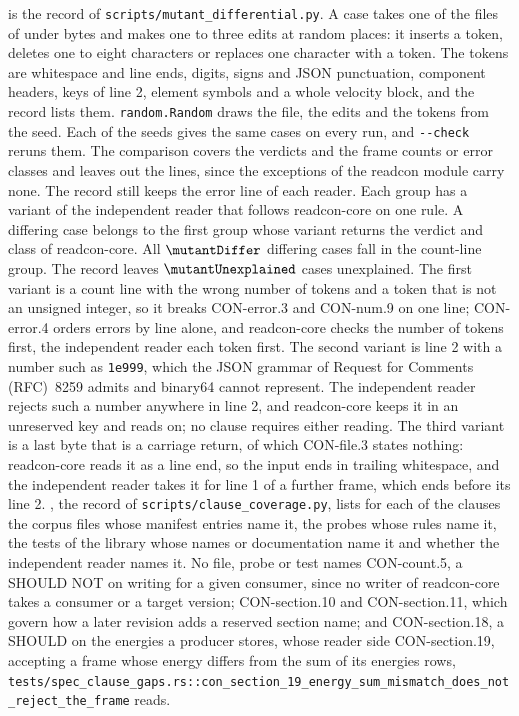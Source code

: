 \documentclass[preprint,12pt]{elsarticle}
\begin{document}
 is the record of \texttt{scripts/\allowbreak mutant\_differential.py}.
A case takes one of the \mutantFiles{} files of  under \mutantMaxBytes{} bytes and makes one to three edits at random places: it inserts a token, deletes one to eight characters or replaces one character with a token.
The tokens are whitespace and line ends, digits, signs and JSON punctuation, component headers, keys of line 2, element symbols and a whole velocity block, and the record lists them.
\texttt{random.Random} draws the file, the edits and the tokens from the seed.
Each of the \mutantSeeds{} seeds gives the same \mutantPerSeed{} cases on every run, and \texttt{-{}-check} reruns them.
The comparison covers the verdicts and the frame counts or error classes and leaves out the lines, since the exceptions of the readcon module carry none.
The record still keeps the error line of each reader.
Each group has a variant of the independent reader that follows readcon-core on one rule.
A differing case belongs to the first group whose variant returns the verdict and class of readcon-core.
All \(\mutantDiffer\) differing cases fall in the count-line group.
The record leaves \(\mutantUnexplained\) cases unexplained.
The first variant is a count line with the wrong number of tokens and a token that is not an unsigned integer, so it breaks CON-error.3 and CON-num.9 on one line; CON-error.4 orders errors by line alone, and readcon-core checks the number of tokens first, the independent reader each token first.
The second variant is line 2 with a number such as \texttt{1e999}, which the JSON grammar of Request for Comments (RFC)~8259 admits and binary64 cannot represent.
The independent reader rejects such a number anywhere in line 2, and readcon-core keeps it in an unreserved key and reads on; no clause requires either reading.
The third variant is a last byte that is a carriage return, of which CON-file.3 states nothing: readcon-core reads it as a line end, so the input ends in trailing whitespace, and the independent reader takes it for line 1 of a further frame, which ends before its line 2.
, the record of \texttt{scripts/\allowbreak clause\_coverage.py}, lists for each of the \clauseTotal{} clauses the corpus files whose manifest entries name it, the probes whose rules name it, the tests of the library whose names or documentation name it and whether the independent reader names it.
No file, probe or test names CON-count.5, a SHOULD NOT on writing for a given consumer, since no writer of readcon-core takes a consumer or a target version; CON-section.10 and CON-section.11, which govern how a later revision adds a reserved section name; and CON-section.18, a SHOULD on the energies a producer stores, whose reader side CON-section.19, accepting a frame whose energy differs from the sum of its energies rows, \texttt{tests/\allowbreak spec\_clause\_gaps.rs::\allowbreak con\_section\_19\_energy\_sum\_mismatch\_does\_not\_reject\_the\_frame} reads.
\end{document}
